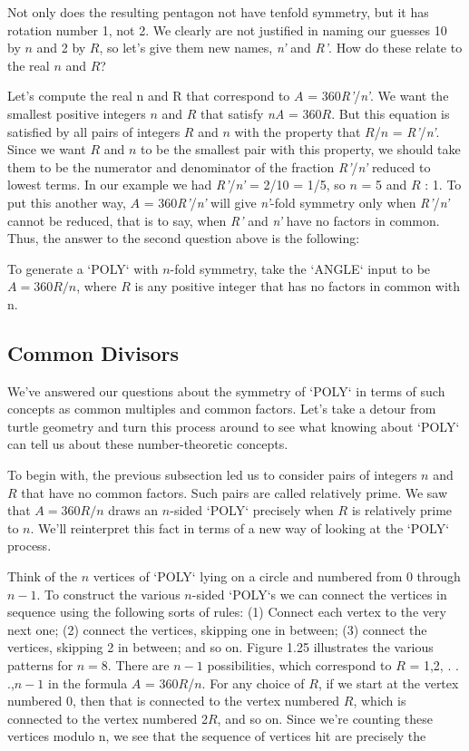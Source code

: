 \documentclass{book}
\begin{document}
Not only does the resulting pentagon not have tenfold symmetry, but it
has rotation number 1, not 2. We clearly are not justified in naming our
guesses 10 by $n$ and 2 by $R$, so let's give them new names, {\em n'} and {\em R'}.
How do these relate to the real $n$ and $R$?

Let's compute the real n and R that correspond to $A$ = 360{\em R'}/{\em n'}. We
want the smallest positive integers $n$ and $R$ that satisfy {\em nA} = 360$R$. But
this equation is satisfied by all pairs of integers $R$ and $n$ with the property
that $R$/$n$ = {\em R'}/{\em n'}. Since we want $R$ and $n$ to be the smallest pair with
this property, we should take them to be the numerator and denominator
of the fraction {\em R'}/{\em n'} reduced to lowest terms. In our example we had
{\em R'}/{\em n'} = 2/10 = 1/5, so $n$ = 5 and $R$ : 1. To put this another way,
$A$ = 360{\em R'}/{\em n'} will give {\em n'}-fold symmetry only when {\em R'}/{\em n'} cannot be
reduced, that is to say, when {\em R'} and {\em n'} have no factors in common.
Thus, the answer to the second question above is the following:

To generate a \textsc{`POLY`} with $n$-fold symmetry, take the \textsc{`ANGLE`} input to be
$A = 360R/n$, where $R$ is any positive integer that has no factors in
common with n.

\subsection{Common Divisors}

We've answered our questions about the symmetry of \textsc{`POLY`} in terms of
such concepts as common multiples and common factors. Let's take a
detour from turtle geometry and turn this process around to see what
knowing about \textsc{`POLY`} can tell us about these number-theoretic concepts.

To begin with, the previous subsection led us to consider pairs of
integers $n$ and $R$ that have no common factors. Such pairs are called
relatively prime. We saw that $A = 360R/n$ draws an $n$-sided \textsc{`POLY`}
precisely when $R$ is relatively prime to $n$. We'll reinterpret this fact in
terms of a new way of looking at the \textsc{`POLY`} process.

Think of the $n$ vertices of \textsc{`POLY`} lying on a circle and numbered from 0
through $n - 1$. To construct the various $n$-sided \textsc{`POLY`}s we can connect
the vertices in sequence using the following sorts of rules: (1) Connect
each vertex to the very next one; (2) connect the vertices, skipping one
in between; (3) connect the vertices, skipping 2 in between; and so on.
Figure 1.25 illustrates the various patterns for $n = 8$. There are $n - 1$
possibilities, which correspond to $R$ = 1,2, . . .,$n - 1$ in the formula
$A$ = 360$R$/$n$. For any choice of $R$, if we start at the vertex numbered
0, then that is connected to the vertex numbered $R$, which is connected
to the vertex numbered 2$R$, and so on. Since we're counting these vertices modulo n, we see that the sequence of vertices hit are precisely the
\end{document}
